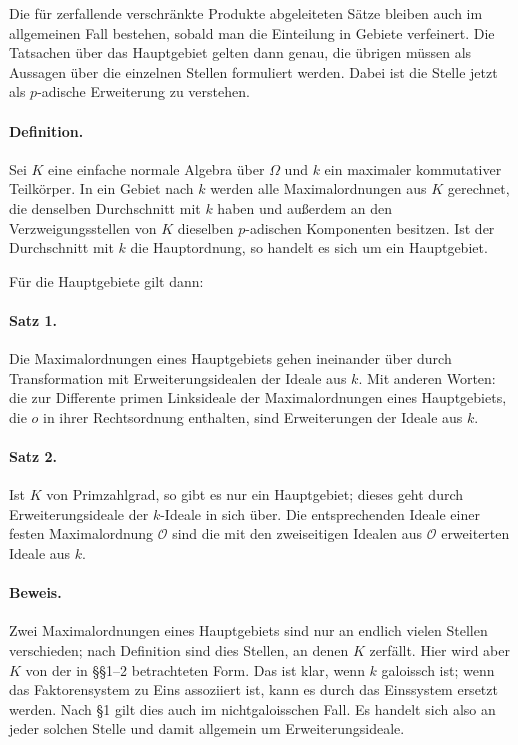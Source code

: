 \documentclass[11pt]{article}
\begin{document}
Die für zerfallende verschränkte Produkte abgeleiteten Sätze bleiben auch im allgemeinen Fall bestehen, sobald man die Einteilung in Gebiete verfeinert. Die Tatsachen über das Hauptgebiet gelten dann genau, die übrigen müssen als Aussagen über die einzelnen Stellen formuliert werden. Dabei ist die Stelle jetzt als \(p\)-adische Erweiterung zu verstehen.

\paragraph{Definition.}
Sei \(K\) eine einfache normale Algebra über \(\Omega\) und \(k\) ein maximaler kommutativer Teilkörper. In ein Gebiet nach \(k\) werden alle Maximalordnungen aus \(K\) gerechnet, die denselben Durchschnitt mit \(k\) haben und außerdem an den Verzweigungsstellen von \(K\) dieselben \(p\)-adischen Komponenten besitzen. Ist der Durchschnitt mit \(k\) die Hauptordnung, so handelt es sich um ein Hauptgebiet.

Für die Hauptgebiete gilt dann:

\paragraph{Satz 1.}
Die Maximalordnungen eines Hauptgebiets gehen ineinander über durch Transformation mit Erweiterungsidealen der Ideale aus \(k\). Mit anderen Worten: die zur Differente primen Linksideale der Maximalordnungen eines Hauptgebiets, die \(o\) in ihrer Rechtsordnung enthalten, sind Erweiterungen der Ideale aus \(k\).

\paragraph{Satz 2.}
Ist \(K\) von Primzahlgrad, so gibt es nur ein Hauptgebiet; dieses geht durch Erweiterungsideale der \(k\)-Ideale in sich über. Die entsprechenden Ideale einer festen Maximalordnung \(\mathcal O\) sind die mit den zweiseitigen Idealen aus \(\mathcal O\) erweiterten Ideale aus \(k\).

\paragraph{Beweis.}
Zwei Maximalordnungen eines Hauptgebiets sind nur an endlich vielen Stellen verschieden; nach Definition sind dies Stellen, an denen \(K\) zerfällt. Hier wird aber \(K\) von der in §§1--2 betrachteten Form. Das ist klar, wenn \(k\) galoissch ist; wenn das Faktorensystem zu Eins assoziiert ist, kann es durch das Einssystem ersetzt werden. Nach §1 gilt dies auch im nichtgaloisschen Fall. Es handelt sich also an jeder solchen Stelle und damit allgemein um Erweiterungsideale.
\end{document}
